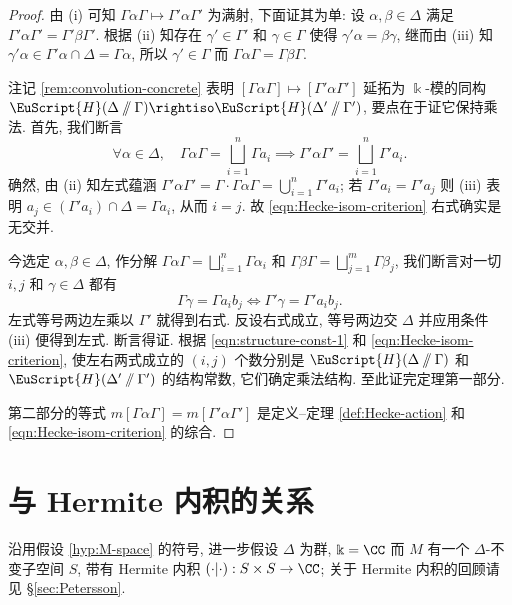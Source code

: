 \begin{proof}
	由 (i) 可知 $\Gamma\alpha\Gamma \mapsto \Gamma' \alpha\Gamma'$ 为满射, 下面证其为单: 设 $\alpha,\beta \in \Delta$ 满足 $\Gamma'\alpha\Gamma' = \Gamma'\beta\Gamma'$. 根据 (ii) 知存在 $\gamma' \in \Gamma'$ 和 $\gamma \in \Gamma$ 使得 $\gamma'\alpha = \beta\gamma$, 继而由 (iii) 知 $\gamma'\alpha \in \Gamma'\alpha \cap \Delta = \Gamma\alpha$, 所以 $\gamma' \in \Gamma$ 而 $\Gamma\alpha\Gamma = \Gamma\beta\Gamma$.
	
	注记 \ref{rem:convolution-concrete} 表明 $[\Gamma\alpha\Gamma] \mapsto [\Gamma'\alpha\Gamma']$ 延拓为 $\Bbbk$-模的同构 $\EuScript{H}(\Delta \sslash \Gamma) \rightiso \EuScript{H}(\Delta' \sslash \Gamma')$, 要点在于证它保持乘法. 首先, 我们断言
	\begin{equation}\label{eqn:Hecke-isom-criterion}
		\forall \alpha \in \Delta, \quad \Gamma \alpha \Gamma = \bigsqcup_{i=1}^n \Gamma a_i \implies \Gamma' \alpha \Gamma' = \bigsqcup_{i=1}^n \Gamma' a_i.
	\end{equation}
	确然, 由 (ii) 知左式蕴涵 $\Gamma' \alpha \Gamma' = \Gamma \cdot \Gamma\alpha\Gamma = \bigcup_{i=1}^n \Gamma' a_i$; 若 $\Gamma' a_i = \Gamma' a_j$ 则 (iii) 表明 $a_j \in (\Gamma' a_i) \cap \Delta = \Gamma a_i$, 从而 $i=j$. 故 \eqref{eqn:Hecke-isom-criterion} 右式确实是无交并.
	
	今选定 $\alpha, \beta \in \Delta$, 作分解 $\Gamma\alpha\Gamma = \bigsqcup_{i=1}^n \Gamma \alpha_i$ 和 $\Gamma\beta\Gamma = \bigsqcup_{j=1}^m \Gamma\beta_j$, 我们断言对一切 $i, j$ 和 $\gamma \in \Delta$ 都有
	\[ \Gamma \gamma = \Gamma a_i b_j \iff \Gamma' \gamma = \Gamma' a_i b_j. \]
	左式等号两边左乘以 $\Gamma'$ 就得到右式. 反设右式成立, 等号两边交 $\Delta$ 并应用条件 (iii) 便得到左式. 断言得证. 根据 \eqref{eqn:structure-const-1} 和 \eqref{eqn:Hecke-isom-criterion}, 使左右两式成立的 $(i,j)$ 个数分别是 $\EuScript{H}(\Delta \sslash \Gamma)$ 和 $\EuScript{H}(\Delta' \sslash \Gamma')$ 的结构常数, 它们确定乘法结构. 至此证完定理第一部分.
	
	第二部分的等式 $m [\Gamma \alpha \Gamma] = m[\Gamma'\alpha\Gamma']$ 是定义--定理 \ref{def:Hecke-action} 和 \eqref{eqn:Hecke-isom-criterion} 的综合.
\end{proof}

\section{与 Hermite 内积的关系}\label{sec:Hermitian-form}
沿用假设 \ref{hyp:M-space} 的符号, 进一步假设 $\Delta$ 为群, $\Bbbk=\CC$ 而 $M$ 有一个 $\Delta$-不变子空间 $S$, 带有 Hermite 内积 $\innerp{\cdot}{\cdot}: S \times S \to \CC$; 关于 Hermite 内积的回顾请见 \S\ref{sec:Petersson}.

